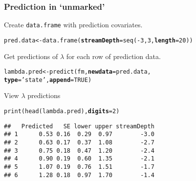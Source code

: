 \documentclass[color=usenames,dvipsnames]{beamer}\usepackage[]{graphicx}\usepackage[]{xcolor}
\makeatletter
\newcommand{\hlnum}[1]{\textcolor[rgb]{0.69,0.494,0}{#1}}%
\newcommand{\hlsng}[1]{\textcolor[rgb]{0.749,0.012,0.012}{#1}}%
\newcommand{\hlopt}[1]{\textcolor[rgb]{0,0,0}{#1}}%
\newcommand{\hldef}[1]{\textcolor[rgb]{0,0,0}{#1}}%
\newcommand{\hlkwb}[1]{\textcolor[rgb]{0,0.341,0.682}{#1}}%
\newcommand{\hlkwc}[1]{\textcolor[rgb]{0,0,0}{\textbf{#1}}}%
\newcommand{\hlkwd}[1]{\textcolor[rgb]{0.004,0.004,0.506}{#1}}%
\newenvironment{kframe}{%
 \def\at@end@of@kframe{}%
 \ifinner\ifhmode%
  \def\at@end@of@kframe{\end{minipage}}%
  \begin{minipage}{\columnwidth}%
 \fi\fi%
 \def\FrameCommand##1{\hskip\@totalleftmargin \hskip-\fboxsep
 \colorbox{shadecolor}{##1}\hskip-\fboxsep
     \hskip-\linewidth \hskip-\@totalleftmargin \hskip\columnwidth}%
 \MakeFramed {\advance\hsize-\width
   \@totalleftmargin\z@ \linewidth\hsize
   \@setminipage}}%
 {\par\unskip\endMakeFramed%
 \at@end@of@kframe}
\newenvironment{knitrout}{}{} %
\makeatother
\begin{document}
\begin{frame}[fragile]
  \frametitle{Prediction in `unmarked'}
  \small
  Create \texttt{data.frame} with prediction covariates. 
  \vspace{-6pt}
\begin{knitrout}\footnotesize
{}\color{fgcolor}\begin{kframe}
\begin{alltt}
\hldef{pred.data} \hlkwb{<-} \hlkwd{data.frame}\hldef{(}\hlkwc{streamDepth}\hldef{=}\hlkwd{seq}\hldef{(}\hlopt{-}\hlnum{3}\hldef{,} \hlnum{3}\hldef{,} \hlkwc{length}\hldef{=}\hlnum{20}\hldef{))}
\end{alltt}
\end{kframe}
\end{knitrout}
\pause
\vfill
Get predictions of $\lambda$ for each row of prediction data.
  \vspace{-6pt}
\begin{knitrout}\footnotesize
{}\color{fgcolor}\begin{kframe}
\begin{alltt}
\hldef{lambda.pred} \hlkwb{<-} \hlkwd{predict}\hldef{(fm,} \hlkwc{newdata}\hldef{=pred.data,}
                       \hlkwc{type}\hldef{=}\hlsng{'state'}\hldef{,} \hlkwc{append}\hldef{=}\hlnum{TRUE}\hldef{)}
\end{alltt}
\end{kframe}
\end{knitrout}
\pause
\vfill
  View $\lambda$ predictions
  \vspace{-6pt}
\begin{knitrout}\footnotesize
{}\color{fgcolor}\begin{kframe}
\begin{alltt}
\hlkwd{print}\hldef{(}\hlkwd{head}\hldef{(lambda.pred),} \hlkwc{digits}\hldef{=}\hlnum{2}\hldef{)}
\end{alltt}
\begin{verbatim}
##   Predicted   SE lower upper streamDepth
## 1      0.53 0.16  0.29  0.97        -3.0
## 2      0.63 0.17  0.37  1.08        -2.7
## 3      0.75 0.18  0.47  1.20        -2.4
## 4      0.90 0.19  0.60  1.35        -2.1
## 5      1.07 0.19  0.76  1.51        -1.7
## 6      1.28 0.18  0.97  1.70        -1.4
\end{verbatim}
\end{kframe}
\end{knitrout}
\end{frame}
\end{document}
